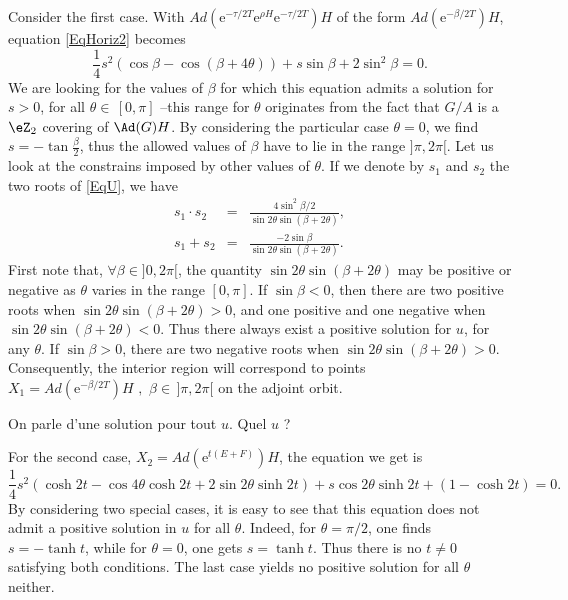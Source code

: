 Consider the first case. With $ Ad(\mbox{e}^{-\tau/2 T} \mbox{e}^{\rho H} \mbox{e}^{-\tau/2 T}) H$ of the form $Ad(\mbox{e}^{-\beta/2 T})H$, equation \eqref{EqHoriz2} becomes
\begin{equation}  \label{EqU}
 \frac{1}{4} s^2 (\cos \beta - \cos(\beta + 4\theta)) + s \sin
 \beta  + 2 \sin^2 \beta = 0.
\end{equation}
We are looking for the values of $\beta$ for which this equation admits a solution for $s>0$, for all $\theta \in \, [0,\pi]$ --this range for $\theta$ originates from the fact that $G/A$ is a $\eZ_2$ covering of $\Ad(G)H$.  By considering the particular case $\theta = 0$, we find $s=-\tan \frac{\beta}{2}$, thus the allowed values of $\beta$ have to lie in the range $]\pi,2\pi[$. Let us look at the constrains imposed by other values of $\theta$. If we denote by $s_1$ and $s_2$ the two roots of \eqref{EqU}, we have
\begin{eqnarray}
 s_1\cdot s_2 &=& \frac{4 \sin^2 \beta/2}{\sin 2\theta \sin(\beta +
 2 \theta)}, \label{PrRac} \\
 s_1 + s_2 &=& \frac{- 2 \sin \beta}{\sin 2\theta \sin(\beta +
 2\theta)}.
 \end{eqnarray}
First note that, $\forall \beta \in ]0,2\pi[$, the quantity $\sin 2\theta \sin(\beta + 2\theta)$ may be positive or negative as $\theta$ varies in the range $[0,\pi]$. If $\sin \beta < 0$, then there are two positive roots when $\sin 2\theta \sin(\beta + 2\theta)>0$, and one positive and one negative when $\sin 2\theta \sin(\beta + 2\theta)<0$. Thus there always exist a positive solution for $u$, for any $\theta$. If $\sin \beta > 0$, there are two negative roots when $\sin 2\theta \sin(\beta + 2\theta)>0$. Consequently, the interior region will correspond to points $X_1 = Ad(\mbox{e}^{-\beta/2 T})H \, \, , \, \, \beta \in \,]\pi , 2\pi[ $ on the adjoint orbit.
\begin{probleme}
On parle d'une solution pour tout $u$. Quel $u$ ?
\end{probleme}

For the second case, $X_2 =Ad(\mbox{e}^{t (E+F)})H$, the equation we get is
\begin{equation}
 \frac{1}{4} s^2 (\cosh 2t - \cos 4\theta \cosh 2t + 2 \sin
 2\theta \sinh 2t) + s \cos 2\theta \sinh 2t + (1 - \cosh 2t) = 0.
 \end{equation}
 By considering two special cases, it is easy to see that this equation does not admit a positive solution in $u$ for all $\theta$. Indeed, for $\theta = \pi/2$, one finds $s =-\tanh t$, while for $\theta = 0$, one gets $s=\tanh t$. Thus there is no $t\ne 0$ satisfying both conditions. The last case yields no positive solution for all $\theta$ neither.

